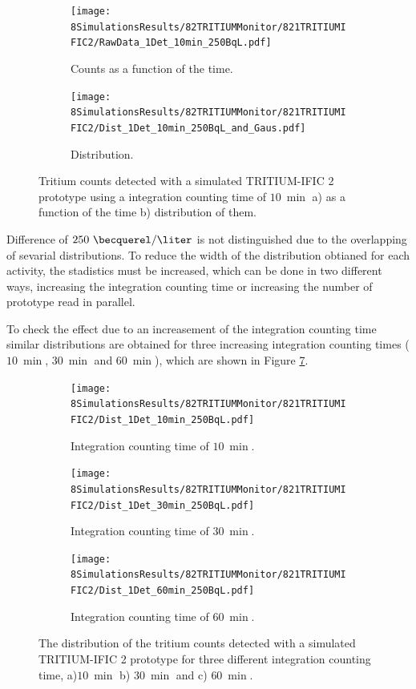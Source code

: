 \begin{figure}
\centering
    \begin{subfigure}[b]{0.45\textwidth}
    \centering
    \texttt{[image: 8SimulationsResults/82TRITIUMMonitor/821TRITIUMIFIC2/RawData\_1Det\_10min\_250BqL.pdf]}  
    \caption{Counts as a function of the time.\label{subfig:RawData1Det10Min250BqL}}
    \end{subfigure}
    \hfill
    \begin{subfigure}[b]{0.45\textwidth}
    \centering
    \texttt{[image: 8SimulationsResults/82TRITIUMMonitor/821TRITIUMIFIC2/Dist\_1Det\_10min\_250BqL\_and\_Gaus.pdf]}  
    \caption{Distribution.\label{subfig:Dist1Det10Min250BqL}}
    \end{subfigure}
 \caption{Tritium counts detected with a simulated TRITIUM-IFIC 2 prototype using a integration counting time of $10~\min$ a) as a function of the time b) distribution of them.}
 \label{fig:1Det10Min250BqL}
\end{figure}

Difference of $250~\becquerel/\liter$ is not distinguished due to the overlapping of sevarial distributions. To reduce the width of the distribution obtianed for each activity, the stadistics must be increased, which can be done in two different ways, increasing the integration counting time or increasing the number of prototype read in parallel.

To check the effect due to an increasement of the integration counting time similar distributions are obtained for three increasing integration counting times ($10~\min$, $30~\min$ and $60~\min$), which are shown in Figure \ref{fig:1Det250BqLseveralTimes}. 

\begin{figure}
\centering
    \begin{subfigure}[b]{0.6\textwidth}
    \centering
    \texttt{[image: 8SimulationsResults/82TRITIUMMonitor/821TRITIUMIFIC2/Dist\_1Det\_10min\_250BqL.pdf]}  
    \caption{Integration counting time of $10~\min$.\label{subfig:1Det10min250BqLST}}
    \end{subfigure}
    \hfill
    \begin{subfigure}[b]{0.6\textwidth}
    \centering
    \texttt{[image: 8SimulationsResults/82TRITIUMMonitor/821TRITIUMIFIC2/Dist\_1Det\_30min\_250BqL.pdf]}  
    \caption{Integration counting time of $30~\min$.\label{subfig:1Det30min250BqLST}}
    \end{subfigure}
    \hfill
    \begin{subfigure}[b]{0.6\textwidth}
    \centering
    \texttt{[image: 8SimulationsResults/82TRITIUMMonitor/821TRITIUMIFIC2/Dist\_1Det\_60min\_250BqL.pdf]}  
    \caption{Integration counting time of $60~\min$.\label{subfig:1Det60min250BqLST}}
    \end{subfigure}
 \caption{The distribution of the tritium counts detected with a simulated TRITIUM-IFIC 2 prototype for three different integration counting time, a)$10~\min$ b) $30~\min$ and c) $60~\min$.}
 \label{fig:1Det250BqLseveralTimes}
\end{figure}

